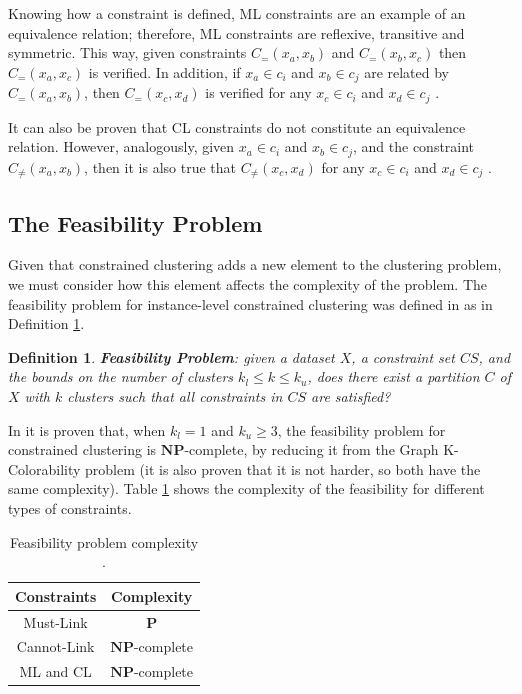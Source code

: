 \documentclass[review]{elsarticle}
\newtheorem{definition}{Definition}
\begin{document}
Knowing how a constraint is defined, ML constraints are an example of an equivalence relation; therefore, ML constraints are reflexive, transitive and symmetric. This way, given constraints $C_=(x_a,x_b)$ and $C_=(x_b,x_c)$ then $C_=(x_a,x_c)$ is verified. In addition, if $x_a \in c_i$ and $x_b \in c_j$ are related by $C_=(x_a,x_b)$, then $C_=(x_c,x_d)$ is verified for any $x_c \in c_i$ and $x_d \in c_j$ \cite{davidson2007survey}.

It can also be proven that CL constraints do not constitute an equivalence relation. However, analogously, given $x_a \in c_i$ and $x_b \in c_j$, and the constraint $C_{\neq}(x_a,x_b)$, then it is also true that $C_{\neq}(x_c,x_d)$ for any $x_c \in c_i$ and $x_d \in c_j$ \cite{davidson2007survey}.

\subsection{The Feasibility Problem} \label{sec:BackFeas}

Given that constrained clustering adds a new element to the clustering problem, we must consider how this element affects the complexity of the problem. The feasibility problem for instance-level constrained clustering was defined in \cite{davidson2005clustering} as in Definition \ref{def1}.

\begin{definition}

	\textbf{Feasibility Problem}: given a dataset $X$, a constraint set $CS$, and the bounds on the number of clusters $k_l \leq k \leq k_u$, does there exist a partition $C$ of $X$ with $k$ clusters such that all constraints in $CS$ are satisfied? \cite{davidson2005clustering}
	\label{def1}

\end{definition}

In \cite{davidson2005clustering} it is proven that, when $k_l = 1$ and $k_u \ge 3$, the feasibility problem for constrained clustering is $\mathbf{NP}$-complete, by reducing it from the Graph K-Colorability problem (it is also proven that it is not harder, so both have the same complexity). Table \ref{tab:feasibility} shows the complexity of the feasibility for different types of constraints.

\begin{table}[!h]
	\centering
	\setlength{\tabcolsep}{7pt}
	\renewcommand{\arraystretch}{1.2}
		\begin{tabular}{c c}
			\hline
			Constraints & Complexity \\
			\hline
			Must-Link & $\mathbf{P}$\\
			Cannot-Link & $\mathbf{NP}$-complete\\
			ML and CL & $\mathbf{NP}$-complete\\
			\hline

		\end{tabular}%
	\caption{Feasibility problem complexity \cite{davidson2005clustering}.}
	\label{tab:feasibility}
\end{table}
\end{document}
